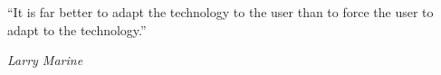 \thispagestyle{empty}
\epigraph{\enquote{It is far better to adapt the technology to the user than to 
force the user to adapt to the technology.}}{\textit{Larry Marine}}
\null\newpage
\thispagestyle{empty}

\null\newpage
